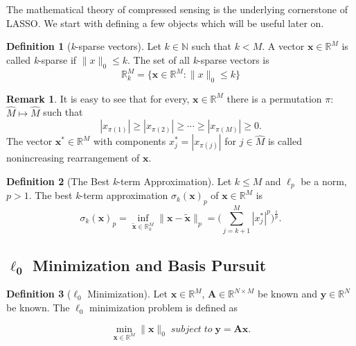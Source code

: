 \documentclass[11pt,oneside,czech,american]{book} %
\theoremstyle{plain}
\theoremstyle{definition}
\newtheorem{defn}{Definition}
\newtheorem{rmrk}{Remark}
\begin{document}
The mathematical theory of compressed sensing is the underlying cornerstone of LASSO. We start with defining a few objects which will be useful later on.
\begin{defn}[\emph{k}-sparse vectors]
	Let $k \in \mathbb{N}$ such that $k<M$. A vector $\bm{x} \in \mathbb{R}^{M}$ is called \emph{k}-sparse if $\lVert x\rVert_{0} \leq k$. The set of all \emph{k}-sparse vectors is
	\begin{equation}
		\mathbb{R}_{k}^{M} = \{ \bm{x} \in \mathbb{R}^{M} : \lVert x\rVert_{0} \leq k\} \label{ksparse}
	\end{equation}
\end{defn}

\begin{rmrk}
	It is easy to see that for every, $\bm{x} \in \mathbb{R}^{M}$ there is a permutation $\pi$: $\hat{M} \mapsto \hat{M}$ such that
	\begin{equation}
		|x_{\pi(1)}|\geq |x_{\pi(2)}|\geq \cdots \geq|x_{\pi(M)}|\geq 0.
	\end{equation}
	The vector $\bm{x}^* \in \mathbb{R}^{M}$ with components $x_{j}^*=|x_{\pi(j)}|$ for $j \in \hat{M}$ is called nonincreasing rearrangement of $\bm{x}$.
\end{rmrk}

\begin{defn}[The Best \emph{k}-term Approximation]
	Let $k \leq M$ and $\ell_{p}$ be a norm, $p>1$. The best \emph{k}-term approximation $\sigma_k (\bm{x})_p$ of $\bm{x} \in \mathbb{R}^{M}$ is
	\begin{equation}
		\sigma_k (\bm{x})_p = \inf_{\bm{\tilde{x}} \in \mathbb{R}^{M}_k}\lVert \bm{x}-\bm{\tilde{x}}\rVert_{p} = \Big(\sum_{j=k+1}^{M}|{x}^{*}_j|^{p}\Big)^{ \frac{1}{p}}.
		\label{best_k_term}
	\end{equation}
\end{defn}

\subsection*{$\bm{\ell_{0}}$ Minimization and Basis Pursuit}

\begin{defn}[$\ell_{0}$ Minimization]
	Let $\bm{x} \in \mathbb{R}^{M}$, $\bm{A} \in \mathbb{R}^{N \times M}$ be known and $\bm{y} \in \mathbb{R}^{N}$ be known. The $\ell_{0}$ minimization problem is defined as
	
	\begin{equation}
		\min_{\bm{{x}} \in \mathbb{R}^{M}}\lVert \bm{x}\rVert_{0} \;subject\; to\; \bm{y} = \bm{A} \bm{x}. \label{l0}
	\end{equation}
\end{defn}
\end{document}
